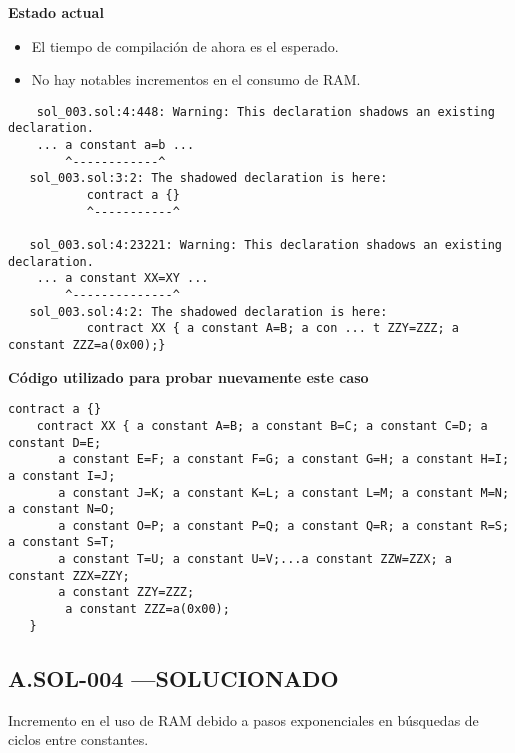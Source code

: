 \textbf{Estado actual}
\begin{itemize}
    \item El tiempo de compilación de ahora es el esperado.
    \item No hay notables incrementos en el consumo de RAM.
\end{itemize}
\begin{lstlisting}
    sol_003.sol:4:448: Warning: This declaration shadows an existing declaration.                                                                   
    ... a constant a=b ...                                                             
        ^------------^                                                                                                                              
   sol_003.sol:3:2: The shadowed declaration is here:                                                                                              
           contract a {}                                                               
           ^-----------^

   sol_003.sol:4:23221: Warning: This declaration shadows an existing declaration.                                                                 
    ... a constant XX=XY ...                                                                                                                        
        ^--------------^                                                                 
   sol_003.sol:4:2: The shadowed declaration is here:                                                                                               
           contract XX { a constant A=B; a con ... t ZZY=ZZZ; a constant ZZZ=a(0x00);}
\end{lstlisting}
\bigskip

\textbf{Código utilizado para probar nuevamente este caso}
\begin{lstlisting}[language=Solidity]
    contract a {}
    contract XX { a constant A=B; a constant B=C; a constant C=D; a constant D=E;
       a constant E=F; a constant F=G; a constant G=H; a constant H=I; a constant I=J;
       a constant J=K; a constant K=L; a constant L=M; a constant M=N; a constant N=O;
       a constant O=P; a constant P=Q; a constant Q=R; a constant R=S; a constant S=T;
       a constant T=U; a constant U=V;...a constant ZZW=ZZX; a constant ZZX=ZZY;
       a constant ZZY=ZZZ;
        a constant ZZZ=a(0x00);
   }   
\end{lstlisting}
\bigskip

\subsection*{A.SOL-004  \color{ForestGreen}—SOLUCIONADO}
Incremento en el uso de RAM debido a pasos exponenciales en búsquedas de ciclos entre constantes.\\

